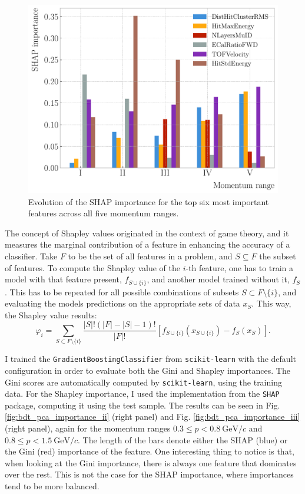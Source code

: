 \begin{figure}[t]
	\centering
	\includegraphics[width=.85\linewidth]{Images/GArSoft_PID/BDT/summary_top_six.pdf}
	\caption{Evolution of the SHAP importance for the top six most important features across all five momentum ranges.}
	\label{fig:bdt_shap_regions}
\end{figure}

The concept of Shapley values originated in the context of game theory, and it measures the marginal contribution of a feature in enhancing the accuracy of a classifier. Take $F$ to be the set of all features in a problem, and $S \subseteq F$ the subset of features. To compute the Shapley value of the $i$-th feature, one has to train a model with that feature present, $f_{S \cup \{i\}}$, and another model trained without it, $f_{S}$. This has to be repeated for all possible combinations of subsets $S \subset F \setminus \{i\}$, and evaluating the models predictions on the appropriate sets of data $x_{S}$. This way, the Shapley value results:
\begin{equation}
	\varphi_{i} = \sum_{S \subset F \setminus \{i\}} \frac{|S|!(|F|-|S|-1)!}{|F|!} \left[f_{S \cup \{i\}}(x_{S \cup \{i\}}) - f_{S}(x_{S})\right].
\end{equation}

I trained the \texttt{GradientBoostingClassifier} from \texttt{scikit-learn} with the default configuration in order to evaluate both the Gini and Shapley importances. The Gini scores are automatically computed by \texttt{scikit-learn}, using the training data. For the Shapley importance, I used the implementation from the \texttt{SHAP} package, computing it using the test sample. The results can be seen in Fig. \ref{fig:bdt_pca_importance_ii} (right panel) and Fig. \ref{fig:bdt_pca_importance_iii} (right panel), again for the momentum ranges $0.3 \leq p < 0.8 ~ \mathrm{GeV}/c$ and $0.8 \leq p < 1.5 ~ \mathrm{GeV}/c$. The length of the bars denote either the SHAP (blue) or the Gini (red) importance of the feature. One interesting thing to notice is that, when looking at the Gini importance, there is always one feature that dominates over the rest. This is not the case for the SHAP importance, where importances tend to be more balanced.

